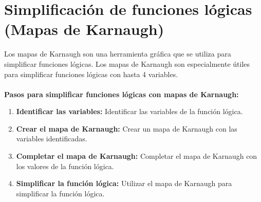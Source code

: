\documentclass{templateNote}
\begin{document}
\section{Simplificación de funciones lógicas (Mapas de Karnaugh)} 
\noindent Los mapas de Karnaugh son una herramienta gráfica que se utiliza para simplificar funciones lógicas. Los mapas de Karnaugh son especialmente útiles para simplificar funciones lógicas con hasta 4 variables.\\\\
\textbf{Pasos para simplificar funciones lógicas con mapas de Karnaugh:}
\begin{enumerate}
    \item \textbf{Identificar las variables:} Identificar las variables de la función lógica.
    \item \textbf{Crear el mapa de Karnaugh:} Crear un mapa de Karnaugh con las variables identificadas.
    \item \textbf{Completar el mapa de Karnaugh:} Completar el mapa de Karnaugh con los valores de la función lógica.
    \item \textbf{Simplificar la función lógica:} Utilizar el mapa de Karnaugh para simplificar la función lógica.
\end{enumerate}
\end{document}
